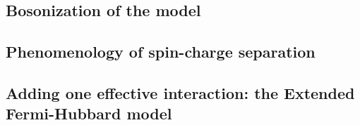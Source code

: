 \subsection{Bosonization of the model}

\todo

\subsection{Phenomenology of spin-charge separation}

\todo

\subsection{Adding one effective interaction: the Extended Fermi-Hubbard model}

\todo